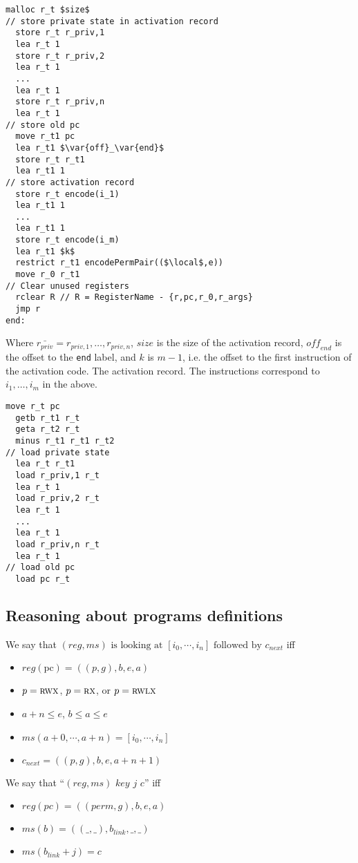\documentclass[format=acmsmall, review=true, screen=true]{acmart}
\newcommand{\var}[1]{\mathit{#1}}
\newcommand{\hs}{\var{ms}}
\newcommand{\ms}{\hs}
\newcommand{\gl}{\var{g}}
\newcommand{\pcreg}{\mathrm{pc}}
\newcommand{\addr}{\var{a}}
\newcommand{\start}{\var{b}}
\newcommand{\addrend}{\var{e}}
\newcommand{\reg}{\var{reg}}
\newcommand{\perm}{\var{perm}}
\newcommand{\stdcap}[1][(\perm,\gl)]{\left(#1,\start,\addrend,\addr \right)}
\newcommand{\link}{\var{link}}
\newcommand{\plainperm}[1]{\textsc{#1}}
\newcommand{\exec}{\plainperm{rx}}
\newcommand{\rwx}{\plainperm{rwx}}
\newcommand{\rwlx}{\plainperm{rwlx}}
\newcommand{\plainlocality}[1]{\mathrm{#1}}
\newcommand{\local}{\plainlocality{local}}
\newcommand{\linksto}[4]{\ensuremath{#1} \text{ links } \ensuremath{#2} \text{ as } \ensuremath{#3} \text{ to } \ensuremath{#4}}
\begin{document}
\begin{lstlisting}[xleftmargin=0.4cm]
  malloc r_t $size$ 
// store private state in activation record
  store r_t r_priv,1
  lea r_t 1
  store r_t r_priv,2
  lea r_t 1
  ...
  lea r_t 1
  store r_t r_priv,n
  lea r_t 1
// store old pc
  move r_t1 pc
  lea r_t1 $\var{off}_\var{end}$ 
  store r_t r_t1
  lea r_t1 1
// store activation record
  store r_t encode(i_1)
  lea r_t1 1
  ...
  lea r_t1 1  
  store r_t encode(i_m)
  lea r_t1 $k$ 
  restrict r_t1 encodePermPair(($\local$,e))
  move r_0 r_t1
// Clear unused registers
  rclear R // R = RegisterName - {r,pc,r_0,r_args}
  jmp r
end:
\end{lstlisting}
Where $\bar{r_{\var{priv}}} = r_{\var{priv},1}, \dots, r_{\var{priv},n}$, $size$ is the size of the activation record, $\var{off}_\var{end}$ is the offset to the \texttt{end} label, and $k$ is $m-1$, i.e. the offset to the first instruction of the activation code.\newline
The activation record. The instructions correspond to $i_1,\dots,i_m$ in the above.
\begin{lstlisting}[xleftmargin=0.4cm]
  move r_t pc
  getb r_t1 r_t
  geta r_t2 r_t
  minus r_t1 r_t1 r_t2
// load private state
  lea r_t r_t1
  load r_priv,1 r_t
  lea r_t 1
  load r_priv,2 r_t
  lea r_t 1
  ...
  lea r_t 1
  load r_priv,n r_t
  lea r_t 1
// load old pc
  load pc r_t
\end{lstlisting}

\subsection{Reasoning about programs definitions}
\label{app:programs-definitions}
\begin{definition}
  We say that $(\reg,\ms) \text{ is looking at } [i_0,\cdots,i_n] \text{ followed by } c_{\mathit{next}}$ 
  iff
  \begin{itemize}
  \item $\reg(\pcreg) = ((p,g),b,e,a)$
  \item $p = \rwx$, $p = \exec$, or $p = \rwlx$
  \item $a+n\leq e$, $b\leq a\leq e$
  \item $\ms(a+0,\cdots,a+n) = [i_0,\cdots,i_n]$
  \item $c_{\mathit{next}} = ((p,g),b,e,a+n+1)$
  \end{itemize}
\end{definition}

\begin{definition}
  We say that ``\linksto{(\reg,\ms)}{\var{key}}{j}{c}'' 
  iff
  \begin{itemize}
  \item $\reg(pc) = \stdcap$
  \item $\ms(\start) = ((\_,\_),\start_\link,\_,\_)$
  \item $\ms(\start_\link+j) = c$
  \end{itemize}
\end{definition}
\end{document}
